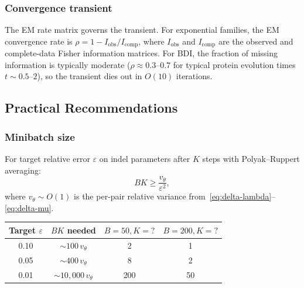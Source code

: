 \subsubsection{Convergence transient}

The EM rate matrix governs the transient.
For exponential families, the EM convergence rate is
$\rho = 1 - I_{\text{obs}} / I_{\text{comp}}$,
where $I_{\text{obs}}$ and $I_{\text{comp}}$ are the observed and
complete-data Fisher information matrices.
For BDI, the fraction of missing information is typically moderate
($\rho \approx 0.3$--$0.7$ for typical protein evolution times
$t \sim 0.5$--$2$), so the transient dies out in $O(10)$ iterations.

\ifdefined\MIXDOMPAPER
\fi

\subsection{Practical Recommendations}

\subsubsection{Minibatch size}

For target relative error $\varepsilon$ on indel parameters after $K$ steps
with Polyak--Ruppert averaging:
\begin{equation}\label{eq:minibatch}
BK \geq \frac{v_\theta}{\varepsilon^2},
\end{equation}
where $v_\theta \sim O(1)$ is the per-pair relative variance
from~\eqref{eq:delta-lambda}--\eqref{eq:delta-mu}.

\begin{center}
\begin{tabular}{cccc}
\toprule
Target $\varepsilon$ & $BK$ needed & $B=50, K=?$ & $B=200, K=?$ \\
\midrule
0.10 & $\sim 100\,v_\theta$ & 2 & 1 \\
0.05 & $\sim 400\,v_\theta$ & 8 & 2 \\
0.01 & $\sim 10{,}000\,v_\theta$ & 200 & 50 \\
\bottomrule
\end{tabular}
\end{center}

